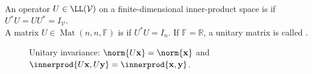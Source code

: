 \begin{definition} \label{def:unitary-operator-and-matrix} \\
An operator $U\in\LL(\mathcal{V})$ on a finite-dimensional inner-product space is  if $U^*U=UU^*=I_{\mathcal{V}}$.\\
A matrix $U\in\operatorname{Mat}(n,n,\mathbb{F})$ is  if $U^*U=I_n$. If $\mathbb{F}=\mathbb{R}$, a unitary matrix is called .
\end{definition}

\begin{figure}[H]
  \centering
  
  \caption{Unitary invariance: $\norm{U\mathbf{x}}=\norm{\mathbf{x}}$ and $\innerprod{U\mathbf{x},U\mathbf{y}}=\innerprod{\mathbf{x},\mathbf{y}}$.}
  \label{fig:unitary-isometry-geometry}
\end{figure}

